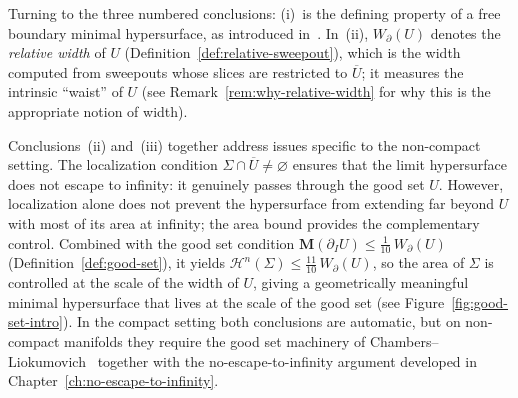 Turning to the three numbered conclusions: (i)~is the defining property of a free boundary minimal hypersurface, as introduced in~\cite{LZ17}. In~(ii), $W_\partial(U)$ denotes the \emph{relative width} of $U$ (Definition~\ref{def:relative-sweepout}), which is the width computed from sweepouts whose slices are restricted to $\overline{U}$; it measures the intrinsic ``waist'' of $U$ (see Remark~\ref{rem:why-relative-width} for why this is the appropriate notion of width).

Conclusions~(ii) and~(iii) together address issues specific to the non-compact setting. The localization condition $\Sigma \cap \overline{U} \neq \varnothing$ ensures that the limit hypersurface does not escape to infinity: it genuinely passes through the good set $U$. However, localization alone does not prevent the hypersurface from extending far beyond $U$ with most of its area at infinity; the area bound provides the complementary control. Combined with the good set condition $\mathbf{M}(\partial_I U) \leq \frac{1}{10}\, W_\partial(U)$ (Definition~\ref{def:good-set}), it yields $\mathcal{H}^n(\Sigma) \leq \frac{11}{10}\, W_\partial(U)$, so the area of $\Sigma$ is controlled at the scale of the width of $U$, giving a geometrically meaningful minimal hypersurface that lives at the scale of the good set (see Figure~\ref{fig:good-set-intro}). In the compact setting both conclusions are automatic, but on non-compact manifolds they require the good set machinery of Chambers--Liokumovich~\cite{CL20} together with the no-escape-to-infinity argument developed in Chapter~\ref{ch:no-escape-to-infinity}.

